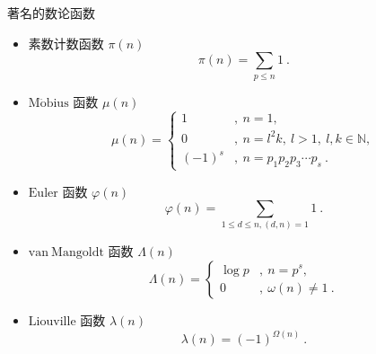 \begin{example}{著名的数论函数}
\begin{itemize}
\item 素数计数函数 $\pi(n)$
\begin{equation}
\pi(n)=\sum_{p\leq n} 1~.
\end{equation}
\item $\mathrm{M\ddot{o}bius}$ 函数 $\mu(n)$
\begin{equation}
\mu(n)=
\begin{cases}
1&,\ n=1,\\
0&,\ n=l^2k,\ l>1,\ l,k\in\mathbb{N},\\
(-1)^s&,\ n=p_1p_2p_3\cdots p_s~.
\end{cases}
\end{equation}
\item $\mathrm{Euler}$ 函数 $\varphi(n)$
\begin{equation}
\varphi(n)=\sum_{1\leq d\leq n,(d,n)=1}1~.
\end{equation}
\item $\mathrm{van\ Mangoldt}$ 函数 $\Lambda(n)$
\begin{equation}
\varLambda(n)=
\begin{cases}
\log p&,\ n=p^s,\\
0&,\ \omega(n)\neq 1~.
\end{cases}
\end{equation}
\item $\mathrm{Liouville}$ 函数 $\lambda(n)$
\begin{equation}
\lambda(n)=(-1)^{\Omega(n)}~.
\end{equation}
\end{itemize}

\end{example}